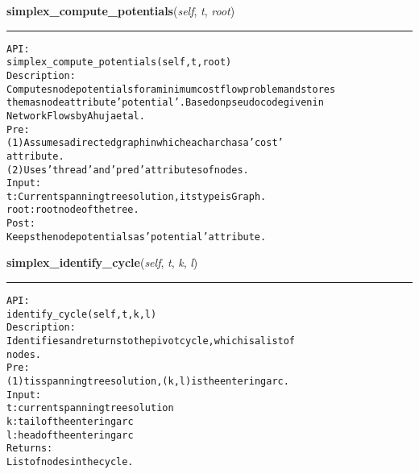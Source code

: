     \label{coinor:gimpy:graph:Graph:simplex_compute_potentials}

    \vspace{0.5ex}

\hspace{.8\funcindent}\begin{boxedminipage}{\funcwidth}

    \raggedright \textbf{simplex\_compute\_potentials}(\textit{self}, \textit{t}, \textit{root})

    \vspace{-1.5ex}

    \rule{\textwidth}{0.5\fboxrule}
\setlength{\parskip}{2ex}
\begin{alltt}

API:
    simplex\_compute\_potentials(self, t, root)
Description:
    Computes node potentials for a minimum cost flow problem and stores
    them as node attribute 'potential'. Based on pseudocode given in
    Network Flows by Ahuja et al.
Pre:
    (1) Assumes a directed graph in which each arc has a 'cost'
    attribute.
    (2) Uses 'thread' and 'pred' attributes of nodes.
Input:
    t: Current spanning tree solution, its type is Graph.
    root: root node of the tree.
Post:
    Keeps the node potentials as 'potential' attribute.
\end{alltt}

\setlength{\parskip}{1ex}
    \end{boxedminipage}

    \label{coinor:gimpy:graph:Graph:simplex_identify_cycle}

    \vspace{0.5ex}

\hspace{.8\funcindent}\begin{boxedminipage}{\funcwidth}

    \raggedright \textbf{simplex\_identify\_cycle}(\textit{self}, \textit{t}, \textit{k}, \textit{l})

    \vspace{-1.5ex}

    \rule{\textwidth}{0.5\fboxrule}
\setlength{\parskip}{2ex}
\begin{alltt}

API:
    identify\_cycle(self, t, k, l)
Description:
    Identifies and returns to the pivot cycle, which is a list of
    nodes.
Pre:
    (1) t is spanning tree solution, (k,l) is the entering arc.
Input:
    t: current spanning tree solution
    k: tail of the entering arc
    l: head of the entering arc
Returns:
    List of nodes in the cycle.
\end{alltt}

\setlength{\parskip}{1ex}
    \end{boxedminipage}

